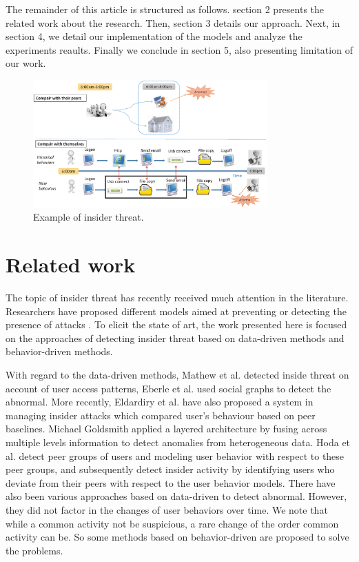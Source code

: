 \documentclass[conference]{IEEEtran}
\begin{document}
The remainder of this article is structured as follows. 
section 2 presents the related work about the research.
Then, section 3 details our approach. Next, in section 4, 
we detail our implementation of the models and analyze the experiments reaults. 
Finally we conclude in section 5, also presenting limitation of our work.

\begin{figure}[htb]
\centerline{\includegraphics[width = 0.8\textwidth]{figure/figure1.eps}}
\caption{Example of insider threat.}
\label{fig}
\end{figure}


\section{Related work}
The topic of insider threat has recently received much attention in the literature. Researchers have proposed different models aimed at preventing or detecting the presence of attacks \cite{b11}\cite{b12}. To elicit the state of art, the work
presented here is focused on the approaches of detecting  insider threat based on data-driven methods and behavior-driven methods.

With regard to the data-driven methods, Mathew et al.\cite{b13} detected inside threat on account of user access patterns, Eberle et al. \cite{b14} used social graphs to detect the abnormal. More recently, Eldardiry et al. \cite{b15} have also proposed a system in managing insider
attacks which compared user’s behaviour based on peer baselines.
Michael Goldsmith applied a layered architecture by  fusing across multiple levels information to detect anomalies from heterogeneous data\cite{b16}. Hoda et al. \cite{b13} detect peer groups of users and modeling user behavior with respect to these peer groups, and subsequently detect insider activity by identifying users who deviate from their peers with respect to the user behavior models. 
There have also been various approaches based on data-driven to detect abnormal\cite{b7}\cite{b8}. 
However, they did not factor in the changes of user behaviors over time. We note that while a common activity not be suspicious, a rare change of the order  common activity can be. So some methods based on behavior-driven are proposed to solve the problems. 
\end{document}
